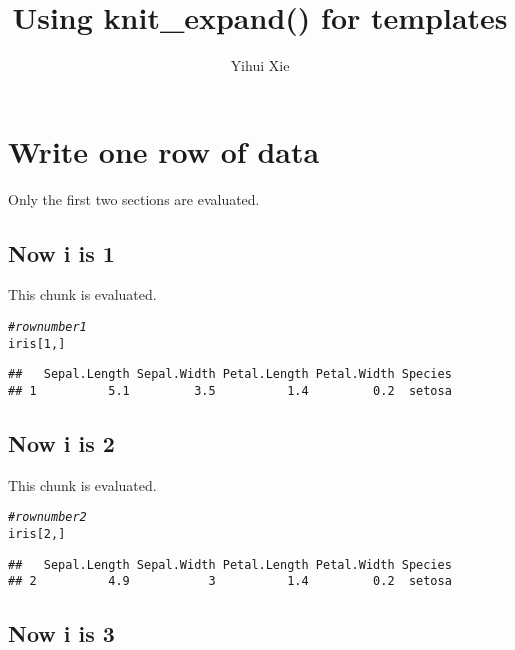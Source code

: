 \documentclass{article}\usepackage[]{graphicx}\usepackage[]{color}
\title{Using knit\_expand() for templates}
\author{Yihui Xie}
\makeatletter
\newcommand{\hlnum}[1]{\textcolor[rgb]{0.686,0.059,0.569}{#1}}%
\newcommand{\hlcom}[1]{\textcolor[rgb]{0.678,0.584,0.686}{\textit{#1}}}%
\newcommand{\hlstd}[1]{\textcolor[rgb]{0.345,0.345,0.345}{#1}}%
\newenvironment{kframe}{%
 \def\at@end@of@kframe{}%
 \ifinner\ifhmode%
  \def\at@end@of@kframe{\end{minipage}}%
  \begin{minipage}{\columnwidth}%
 \fi\fi%
 \def\FrameCommand##1{\hskip\@totalleftmargin \hskip-\fboxsep
 \colorbox{shadecolor}{##1}\hskip-\fboxsep
     \hskip-\linewidth \hskip-\@totalleftmargin \hskip\columnwidth}%
 \MakeFramed {\advance\hsize-\width
   \@totalleftmargin\z@ \linewidth\hsize
   \@setminipage}}%
 {\par\unskip\endMakeFramed%
 \at@end@of@kframe}
\newenvironment{knitrout}{}{} %
\makeatother
\begin{document}
\maketitle
\tableofcontents

\section{Write one row of data}
Only the first two sections are evaluated.


\subsection{Now i is 1}

This chunk is evaluated.
\begin{knitrout}
\color{fgcolor}\begin{kframe}
\begin{alltt}
\hlcom{# row number 1}
\hlstd{iris[}\hlnum{1}\hlstd{, ]}
\end{alltt}
\begin{verbatim}
##   Sepal.Length Sepal.Width Petal.Length Petal.Width Species
## 1          5.1         3.5          1.4         0.2  setosa
\end{verbatim}
\end{kframe}
\end{knitrout}
\subsection{Now i is 2}

This chunk is evaluated.
\begin{knitrout}
\color{fgcolor}\begin{kframe}
\begin{alltt}
\hlcom{# row number 2}
\hlstd{iris[}\hlnum{2}\hlstd{, ]}
\end{alltt}
\begin{verbatim}
##   Sepal.Length Sepal.Width Petal.Length Petal.Width Species
## 2          4.9           3          1.4         0.2  setosa
\end{verbatim}
\end{kframe}
\end{knitrout}
\subsection{Now i is 3}
\end{document}
